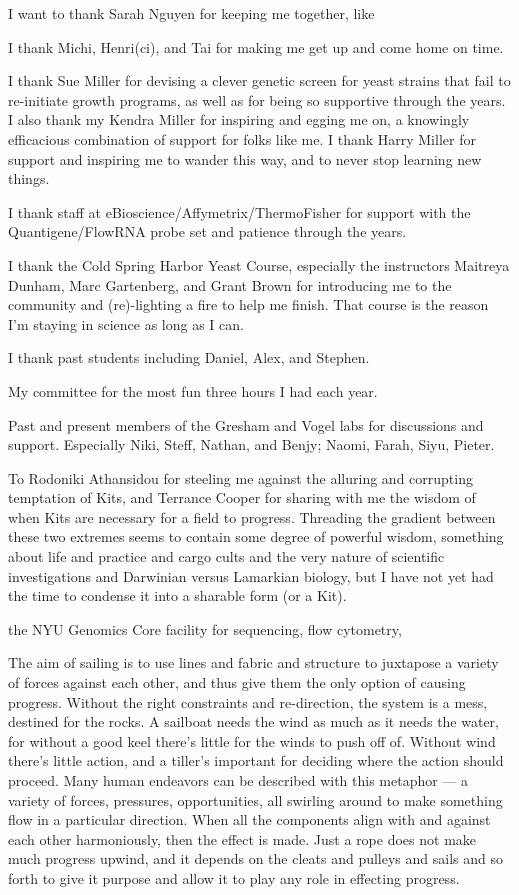 \documentclass[12pt,letterpaper]{memoir}
\begin{document}
I want to thank Sarah Nguyen for keeping me together, like 

I thank Michi, Henri(ci), and Tai for making me get up and come 
home on time.


I thank Sue Miller for devising a clever genetic screen for yeast
strains that fail to re-initiate growth programs, as well as for
being so supportive through the years.
I also thank my Kendra Miller for inspiring and egging me on, 
a knowingly efficacious combination of support for folks like me.
I thank Harry Miller for support and inspiring me to wander this way,
and to never stop learning new things.

I thank staff at eBioscience/Affymetrix/ThermoFisher for support with
the Quantigene/FlowRNA probe set and patience through the years.

I thank the Cold Spring Harbor Yeast Course, especially the instructors
Maitreya Dunham, Marc Gartenberg, and Grant Brown for introducing
me to the community and (re)-lighting a fire to help me finish.
That course is the reason I'm staying in science as long as I can.

I thank past students including Daniel, Alex, and Stephen.

My committee for the most fun three hours I had each year.

Past and present members of the Gresham and Vogel labs for 
discussions and support.
Especially Niki, Steff, Nathan, and Benjy; Naomi, Farah, Siyu,
Pieter.

To Rodoniki Athansidou for steeling me against the alluring
and corrupting temptation of Kits, and Terrance Cooper for sharing
with me the wisdom of when Kits are necessary for a field to
progress. Threading the gradient between these two extremes seems to
contain some degree of powerful wisdom, something about life and
practice and cargo cults and the very nature of scientific
investigations and Darwinian versus Lamarkian biology, but I have 
not yet had the time to condense it into a sharable form (or a Kit).


the NYU Genomics Core facility for sequencing, flow cytometry,


The aim of sailing is to use lines and fabric and structure to
juxtapose a variety of forces against each other, 
and thus give them the only option of causing progress. 
Without the right constraints and re-direction, 
the system is a mess, destined for the rocks.
A sailboat needs the wind as much as it needs the water,
for without a good keel there's little for the winds to push off of.
Without wind there's little action, and a tiller's important for
deciding where the action should proceed.
Many human endeavors can be described with 
this metaphor --- a variety of forces, pressures, opportunities, 
all swirling around to make something flow in a particular
direction. When all the components align with and against each
other harmoniously, then the effect is made. Just a rope does not make
much progress upwind, and it depends on the cleats and pulleys and
sails and so forth to give it purpose and allow it to play any role in
effecting progress.
 
\end{document}
